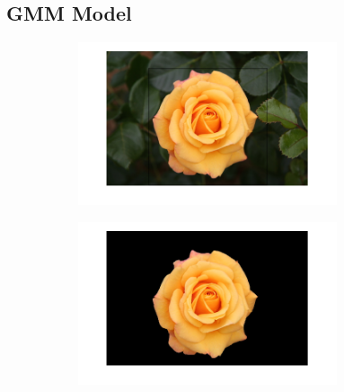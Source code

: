 \documentclass[a4paper]{article}
\begin{document}
\subsection{GMM Model}
\begin{figure}[h]
\begin{subfigure}{.5\textwidth}
  \centering
  \includegraphics[width = 3in]{rose_input_g.png}
  \label{fig:sfig1}
\end{subfigure}%
\begin{subfigure}{.5\textwidth}
  \centering
  \includegraphics[width = 3in]{rose_output_g.png}
  \label{fig:sfig2}
\end{subfigure}



\end{figure}
\end{document}
